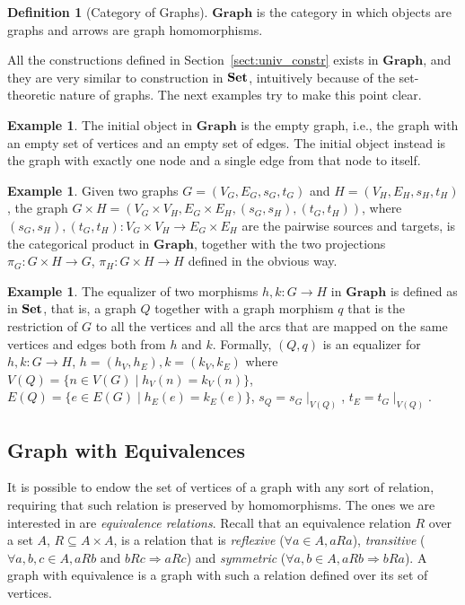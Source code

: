 \documentclass[a4paper, twoside,openright]{report}
\theoremstyle{plain}
\theoremstyle{definition}
\newtheorem{definition}[theorem]{Definition}
\newtheorem{example}[theorem]{Example}
\begin{document}
\begin{definition}[Category of Graphs]\label{def:cat_of_graph}
    $\mathbf{Graph}$ is the category in which objects are graphs and arrows are graph homomorphisms.
\end{definition}

All the constructions defined in Section~\ref{sect:univ_constr} exists in $\mathbf{Graph}$, and they are very similar to construction in $\mathbf{Set}$, intuitively because of the set-theoretic nature of graphs. The next examples try to make this point clear.

\begin{example}\label{ex:in_term_in_graph}
    The initial object in $\mathbf{Graph}$ is the empty graph, i.e., the graph with an empty set of vertices and an empty set of edges. The initial object instead is the graph with exactly one node and a single edge from that node to itself.
\end{example}

\begin{example}
    Given two graphs $G = (V_G, E_G, s_G, t_G)$ and $H=(V_H, E_H, s_H, t_H)$, the graph $G \times H = (V_G\times V_H, E_G \times E_H, (s_G, s_H), (t_G, t_H))$, where $(s_G, s_H), (t_G, t_H):V_G\times V_H \rightarrow E_G \times E_H$ are the pairwise sources and targets, is the categorical product in $\mathbf{Graph}$, together with the two projections $\pi_G: G \times H \rightarrow G$, $\pi_H : G \times H \rightarrow H$ defined in the obvious way.
\end{example}

\begin{example}
    The equalizer of two morphisms $h, k: G \rightarrow H$ in $\mathbf{Graph}$ is defined as in $\mathbf{Set}$, that is,  a graph $Q$ together with a graph morphism $q$ that is the restriction of $G$ to all the vertices and all the arcs that are mapped on the same vertices and edges both from $h$ and $k$. Formally, $(Q, q)$ is an equalizer for $h, k: G \rightarrow H$, $h = (h_V, h_E), k = (k_V, k_E)$ where $V(Q) = \{ n \in V(G) \mid h_V(n) = k_V(n)\}$, $E(Q) = \{ e \in E(G) \mid h_E(e) = k_E(e)\}$, $s_Q = s_G \mid_{V(Q)}$, $t_E = t_G \mid_{V(Q)}$.
\end{example}

\subsection{Graph with Equivalences}

It is possible to endow the set of vertices of a graph with any sort of relation, requiring that such relation is preserved by homomorphisms. The ones we are interested in are \emph{equivalence relations}. Recall that an equivalence relation $R$ over a set $A$, $R \subseteq A\times A$, is a relation that is \emph{reflexive} ($\forall a \in A, aRa$), \emph{transitive} ($\forall a, b, c \in A, aRb \text{ and } bRc \Rightarrow aRc$) and \emph{symmetric} ($\forall a, b \in A, aRb \Rightarrow bRa$). A graph with equivalence is a graph with such a relation defined over its set of vertices.
\end{document}
